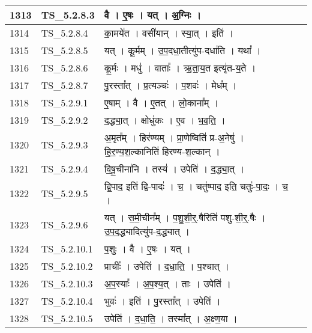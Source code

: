 \documentclass[17pt]{extarticle}
\begin{document}
\begin{longtable}{||p{0.4in}||p{0.9in}||p{4.0in}||p{0.9in}||}
        \hline
            1313 & TS\_5.2.8.3 & वै   ।   ए॒षः   ।   यत्   ।   अ॒ग्निः   ।    &      \\
        \hline
            1314 & TS\_5.2.8.4 & का॒मये॑त   ।   वसी॑यान्   ।   स्या॒त्   ।   इति॑   ।    &      \\
        \hline
            1315 & TS\_5.2.8.5 & यत्   ।   कू॒र्मम्   ।   उ॒प॒दधा॒तीत्यु॑प{-}दधा॑ति   ।   यथा᳚   ।    &      \\
        \hline
            1316 & TS\_5.2.8.6 & कू॒र्मः   ।   मधु॑   ।   वाताः᳚   ।   ऋ॒ता॒य॒त इत्यृ॑त{-}य॒ते   ।    &      \\
        \hline
            1317 & TS\_5.2.8.7 & पु॒रस्ता᳚त्   ।   प्र॒त्यञ्चः॑   ।   प॒शवः॑   ।   मेध᳚म्   ।    &      \\
        \hline
            1318 & TS\_5.2.9.1 & ए॒षाम्   ।   वै   ।   ए॒तत्   ।   लो॒काना᳚म्   ।    &      \\
        \hline
            1319 & TS\_5.2.9.2 & द॒द्ध्या॒त्   ।   क्षोधु॑कः   ।   ए॒व   ।   भ॒व॒ति॒   ।    &      \\
        \hline
            1320 & TS\_5.2.9.3 & अ॒मृत᳚म्   ।   हिर॑ण्यम्   ।   प्रा॒णेष्विति॑ प्र{-}अ॒नेषु॑   ।   हि॒र॒ण्य॒श॒ल्कानिति॑ हिरण्य{-}श॒ल्कान्   ।    &      \\
        \hline
            1321 & TS\_5.2.9.4 & वि॒षू॒चीना॑नि   ।   तस्य॑   ।   उपेति॑   ।   द॒द्ध्या॒त्   ।    &      \\
        \hline
            1322 & TS\_5.2.9.5 & द्वि॒पाद॒ इति॑ द्वि{-}पादः॑   ।   च॒   ।   चतु॑ष्पाद॒ इति॒ चतुः॑{-}पा॒दः॒   ।   च॒   ।    &      \\
        \hline
            1323 & TS\_5.2.9.6 & यत्   ।   स॒मी॒चीन᳚म्   ।   प॒शु॒शी॒र्॒.षैरिति॑ पशु{-}शी॒र्॒.षैः   ।   उ॒प॒द॒द्ध्यादित्यु॑प{-}द॒द्ध्यात्   ।    &      \\
        \hline
            1324 & TS\_5.2.10.1 & प॒शुः   ।   वै   ।   ए॒षः   ।   यत्   ।    &      \\
        \hline
            1325 & TS\_5.2.10.2 & प्राचीः᳚   ।   उपेति॑   ।   द॒धा॒ति॒   ।   प॒श्चात्   ।    &      \\
        \hline
            1326 & TS\_5.2.10.3 & अ॒प॒स्याः᳚   ।   अ॒प॒श्य॒त्   ।   ताः   ।   उपेति॑   ।    &      \\
        \hline
            1327 & TS\_5.2.10.4 & भुवः॑   ।   इति॑   ।   पु॒रस्ता᳚त्   ।   उपेति॑   ।    &      \\
        \hline
            1328 & TS\_5.2.10.5 & उपेति॑   ।   द॒धा॒ति॒   ।   तस्मा᳚त्   ।   अ॒क्ष्ण॒या   ।    &      \\

\end{longtable}
\end{document}
